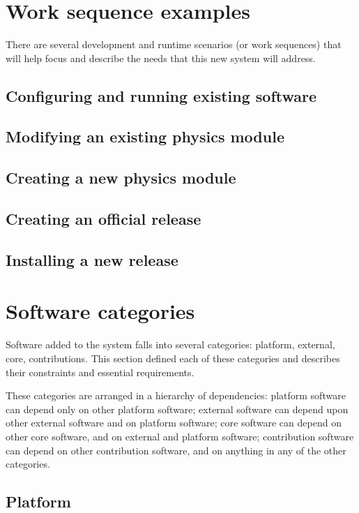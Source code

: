 \documentclass[draftmode,draftwater]{memarticle}
\begin{document}
\section{Work sequence examples}

There are several development and runtime scenarios (or work
sequences) that will help focus and describe the needs that this new system will
address.

\subsection{Configuring and running existing software}
\subsection{Modifying an existing physics module}
\subsection{Creating a new physics module}
\subsection{Creating an official release}
\subsection{Installing a new release}

\section{Software categories}

Software added to the system falls into several categories: platform,
external, core, contributions. This section defined each of these
categories and describes their constraints and essential requirements.

These categories are arranged in a hierarchy of dependencies: platform
software can depend only on other platform software; external software
can depend upon other external software and on platform software; core
software can depend on other core software, and on external and platform
software; contribution software can depend on other contribution
software, and on anything in any of the other categories.

\subsection{Platform}
\end{document}
